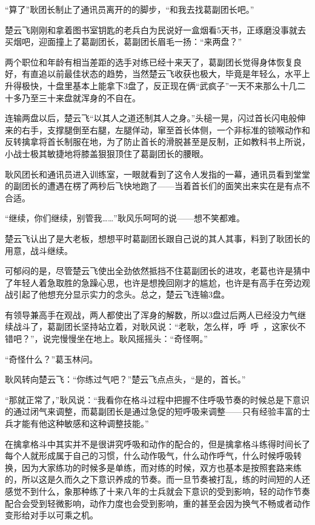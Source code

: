 “算了”耿团长制止了通讯员离开的的脚步，“和我去找葛副团长吧。”

楚云飞刚刚和拿着图书室钥匙的老兵白为民说好一盒烟看5天书，正琢磨没事就去买烟吧，迎面撞上了葛副团长，葛副团长眉毛一扬：“来两盘？”

两个职位和年龄有相当差距的选手对练已经十来天了，葛副团长觉得身体恢复良好，有直追以前最佳状态的趋势，当然楚云飞收获也极大，毕竟是年轻么，水平上升得极快，十盘里基本上能拿下3盘了，反正现在俩“武疯子”一天不来那么十几二十多乃至三十来盘就浑身的不自在。

连输两盘以后，楚云飞“以其人之道还制其人之身。”头槌一晃，闪过首长闪电般伸来的右手，支撑腿倒至右腿，左腿佯动，窜至首长体侧，一个非标准的锁喉动作和反转擒拿将首长制服在地，为了防止首长的滑脱甚至是反制，正如教科书上所说，小战士极其敏捷地将膝盖狠狠顶住了葛副团长的腰眼。

耿风团长和通讯员进入训练室，一眼就看到了这令人发指的一幕，通讯员看到堂堂的副团长的遭遇在楞了两秒后飞快地跑了——当着首长们的面笑出来实在是有点不合适。

“继续，你们继续，别管我……”耿风乐呵呵的说——想不笑都难。

楚云飞认出了是大老板，想想平时葛副团长跟自己说的其人其事，料到了耿团长的用意，战斗继续。

可郁闷的是，尽管楚云飞使出全劲依然抵挡不住葛副团长的进攻，老葛也许是猜中了年轻人着急取胜的急躁心思，也许是想挽回刚才的尴尬，也许是有高手在旁边观战引起了他想充分显示实力的念头。总之，楚云飞连输3盘。

有领导兼高手在观战，两人都使出了浑身的解数，所以3盘过后两人已经没力气继续战斗了，葛副团长坚持站立着，对耿风说：“老耿，怎么样，呼~呼~，这家伙不错吧？”，说完慢慢坐在地上。耿风摇摇头：“奇怪啊。”

“奇怪什么？”葛玉林问。

耿风转向楚云飞：“你练过气吧？”楚云飞点点头，“是的，首长。”

“那就正常了，”耿风说：“我看你在格斗过程中把握不住呼吸节奏的时候总是下意识的通过闭气来调整，而葛副团长是通过急促的短呼吸来调整——只有经验丰富的士兵才能有他这种敏感和这种调整技能。”

在擒拿格斗中其实并不是很讲究呼吸和动作的配合的，但是擒拿格斗练得时间长了每个人就形成属于自己的习惯，什么动作吸气，什么动作呼气，什么时候呼吸转换，因为大家练功的时候多是单练，而对练的时候，双方也基本是按照套路来练的，所以这是久而久之下意识养成的节奏。而一旦节奏被打乱，练的时间短的人还感觉不到什么，象那种练了十来八年的士兵就会下意识的受到影响，轻的动作节奏配合会受到轻微影响，动作力度也会受到影响，重的甚至会因为换气不畅或者动作变形给对手以可乘之机。


